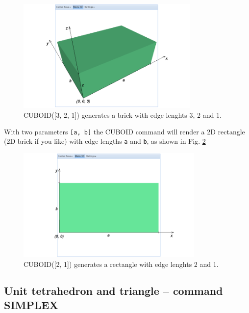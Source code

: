 \documentclass{article}
\begin{document}
\begin{figure}[!ht]
\begin{center}
\includegraphics[width=0.8\textwidth]{img/cuboid-1.png}
\end{center}
\vspace{-2mm}
\caption{CUBOID([3, 2, 1]) generates a brick with edge lenghts 3, 2 and 1.}
\label{fig:cuboid-1}
\end{figure}
\noindent
With two parameters {\tt [a, b]} the CUBOID command will render a 2D rectangle 
(2D brick if you like) with edge lengths {\tt a} and {\tt b}, as shown in 
Fig. \ref{fig:cuboid-2}

\newpage

\begin{figure}[!ht]
\begin{center}
\includegraphics[width=0.82\textwidth]{img/cuboid-2.png}
\end{center}
\vspace{-2mm}
\caption{CUBOID([2, 1]) generates a rectangle with edge lenghts 2 and 1.}
\label{fig:cuboid-2}
\end{figure}


\subsection{Unit tetrahedron and triangle -- command SIMPLEX}
\end{document}
